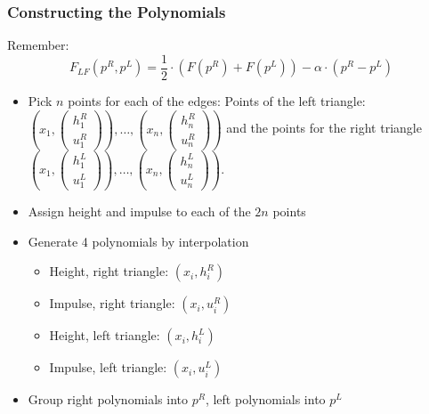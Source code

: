 \documentclass{beamer}
\begin{document}
\begin{frame}
  \frametitle{Constructing the Polynomials}
  Remember:
  \begin{equation*}
    F_{LF}(p^R,p^L) = \dfrac{1}{2}\cdot (F(p^R) + F(p^L)) - \alpha \cdot (p^R - p^L)
  \end{equation*}
  \begin{itemize}
  \item Pick $n$ points for each of the edges: Points of the left triangle:
    $\left(x_1,\begin{pmatrix}
        h_1^R \\ u_1^R
      \end{pmatrix}\right), \dots , \left(x_n, \begin{pmatrix}
        h_n^R \\ u_n^R
      \end{pmatrix}\right)$ and the points for the right triangle 
    $\left(x_1,\begin{pmatrix}
        h_1^L \\ u_1^L
      \end{pmatrix}\right), \dots , \left(x_n,\begin{pmatrix}
        h_n^L \\ u_n^L
      \end{pmatrix}\right)$.
  \item Assign height and impulse to each of the $2n$ points
  \item Generate 4 polynomials by interpolation
    \begin{itemize}
    \item Height, right triangle: $(x_i, h_i^R)$
    \item Impulse, right triangle: $(x_i, u_i^R)$
    \item Height, left triangle: $(x_i, h_i^L)$
    \item Impulse, left triangle: $(x_i, u_i^L)$
    \end{itemize}
  \item Group right polynomials into $p^R$, left polynomials into $p^L$
  \end{itemize}
\end{frame}
\end{document}
